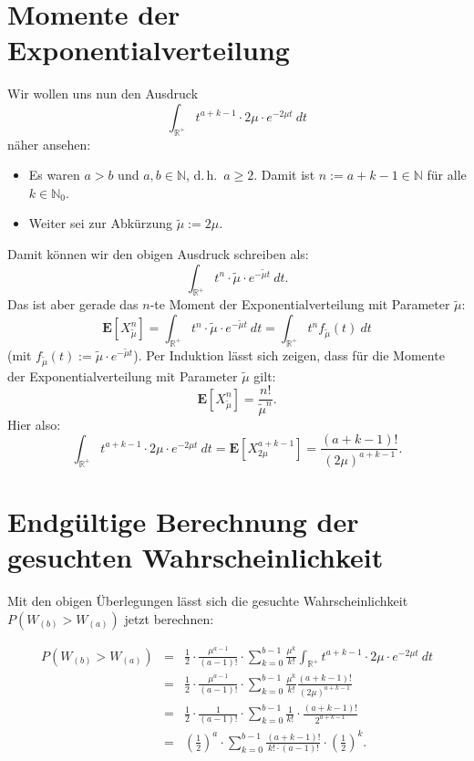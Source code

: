 \documentclass[a4paper,11pt,oneside]{article}
\begin{document}
\section{Momente der Exponentialverteilung}

Wir wollen uns nun den Ausdruck
$$
\int_{\mathbb{R}^+}t^{a+k-1}\cdot2\mu\cdot e^{-2\mu t}~dt
$$
näher ansehen:

\begin{itemize}
\item Es waren $a>b$ und $a,b\in\mathbb{N}$, d.\,h.\ $a\ge2$. Damit ist $n:=a+k-1\in\mathbb{N}$ für alle $k\in\mathbb{N}_0$.
\item Weiter sei zur Abkürzung $\tilde\mu:=2\mu$.
\end{itemize}

Damit können wir den obigen Ausdruck schreiben als:
$$
\int_{\mathbb{R}^+}t^{n}\cdot\tilde\mu\cdot e^{-\tilde\mu t}~dt.
$$
Das ist aber gerade das $n$-te Moment der Exponentialverteilung mit Parameter $\tilde\mu$:
$$
\mathbf{E}[X_{\tilde\mu}^n]=
\int_{\mathbb{R}^+}t^{n}\cdot\tilde\mu\cdot e^{-\tilde\mu t}~dt=
\int_{\mathbb{R}^+}t^{n} f_{\tilde\mu}(t)~dt
$$
(mit $f_{\tilde\mu}(t):=\tilde\mu\cdot e^{-\tilde\mu t}$). Per Induktion lässt sich zeigen, dass für die Momente der Exponentialverteilung mit Parameter $\tilde\mu$ gilt:
$$
\mathbf{E}[X_{\tilde\mu}^n]=\frac{n!}{\tilde\mu^n}.
$$
Hier also:
$$
\int_{\mathbb{R}^+}t^{a+k-1}\cdot2\mu\cdot e^{-2\mu t}~dt=
\mathbf{E}[X_{2\mu}^{a+k-1}]=\frac{(a+k-1)!}{(2\mu)^{a+k-1}}.
$$



\section{Endgültige Berechnung der gesuchten Wahrscheinlichkeit}

Mit den obigen Überlegungen lässt sich die gesuchte Wahrscheinlichkeit $P(W_{(b)}>W_{(a)})$ jetzt berechnen:

\begin{eqnarray*}
P(W_{(b)}>W_{(a)})&=&
\frac{1}{2}\cdot\frac{\mu^{a-1}}{(a-1)!}\cdot\sum_{k=0}^{b-1} \frac{\mu^k}{k!}\int_{\mathbb{R}^+}t^{a+k-1}\cdot2\mu\cdot e^{-2\mu t}~dt\\
~&=& \frac{1}{2}\cdot\frac{\mu^{a-1}}{(a-1)!}\cdot\sum_{k=0}^{b-1} \frac{\mu^k}{k!} \frac{(a+k-1)!}{(2\mu)^{a+k-1}}\\
~&=& \frac{1}{2}\cdot\frac{1}{(a-1)!}\cdot\sum_{k=0}^{b-1}\frac{1}{k!}\cdot\frac{(a+k-1)!}{2^{a+k-1}}\\
~&=& \left(\frac{1}{2}\right)^a\cdot\sum_{k=0}^{b-1}\frac{(a+k-1)!}{k!\cdot(a-1)!}\cdot\left(\frac{1}{2}\right)^k.
\end{eqnarray*}
\end{document}
